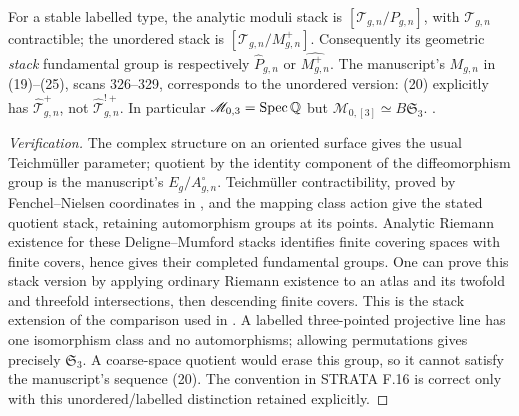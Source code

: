 For a stable labelled type, the analytic moduli stack is
$[\mathcal T_{g,n}/P_{g,n}]$, with $\mathcal T_{g,n}$ contractible; the unordered stack is $[\mathcal T_{g,n}/M^+_{g,n}]$. Consequently its geometric \emph{stack} fundamental group is respectively $\widehat P_{g,n}$ or $\widehat{M^+_{g,n}}$. The manuscript's $M_{g,n}$ in (19)--(25), scans 326--329, corresponds to the unordered version: (20) explicitly has $\widehat{\mathcal T}^+_{g,n}$, not $\widehat{\mathcal T}^{!+}_{g,n}$. In particular
$\mathscr M_{0,3}=\operatorname{Spec}\mathbb Q$ but $\mathscr M_{0,[3]}\simeq B\mathfrak S_3$.
.
\begin{proof}[Verification]
The complex structure on an oriented surface gives the usual Teichm\"uller parameter; quotient by the identity component of the diffeomorphism group is the manuscript's $E_g/A^\circ_{g,n}$. Teichm\"uller contractibility, proved by Fenchel--Nielsen coordinates in \citet[Theorem 10.6 and \S10.6.3]{AF_FarbMargalit2012}, and the mapping class action give the stated quotient stack, retaining automorphism groups at its points. Analytic Riemann existence for these Deligne--Mumford stacks identifies finite covering spaces with finite \etale covers, hence gives their completed fundamental groups. One can prove this stack version by applying ordinary Riemann existence to an \etale atlas and its twofold and threefold intersections, then descending finite covers. This is the stack extension of the comparison used in \citet[\S13.9]{AF_BGH2020}. A labelled three-pointed projective line has one isomorphism class and no automorphisms; allowing permutations gives precisely $\mathfrak S_3$. A coarse-space quotient would erase this group, so it cannot satisfy the manuscript's sequence (20). The convention in STRATA F.16 is correct only with this unordered/labelled distinction retained explicitly.
\end{proof}

